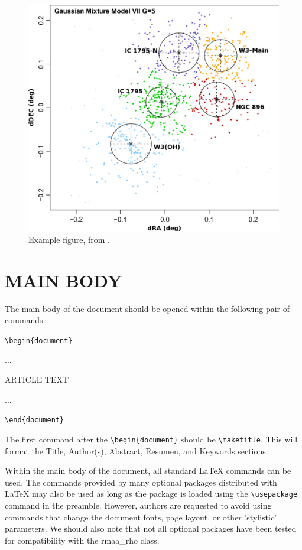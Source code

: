 \documentclass[9pt,article,twoside]{rmaa-rho-class/rmaa-rho}
\newcommand{\CS}[1]{\texttt{\textbackslash #1}}
\begin{document}
        \begin{figure}[ht]
            \centering
            \includegraphics[width=0.99\columnwidth]{figures/GMM_W3.pdf}
            \caption{Example figure, from \cite{Roman+15}.}
            \label{fig:figure1}
        \end{figure}

\section{MAIN BODY}

    The main body of the document should be opened within the following pair of commands:
    
    \bigskip
    \CS{begin}\verb+{document}+
    
    ...
    
    ARTICLE TEXT
    
    ...
    
    \CS{end}\verb+{document}+
    \bigskip
    
    The first command after the \CS{begin}\verb+{document}+ should be \CS{maketitle}. This will format the Title, Author(s), Abstract, Resumen, and Keywords sections.
    
    Within the main body of the document, all standard \LaTeX{} commands can be used. The commands provided by many optional packages distributed with \LaTeX{} may also be used as long as the package is loaded using the \CS{usepackage} command in the preamble. However, authors are requested to avoid using commands that change the document fonts, page layout, or other 'stylistic' parameters. We should also note that not all optional packages have been tested for compatibility with the rmaa\_rho class.
\end{document}
